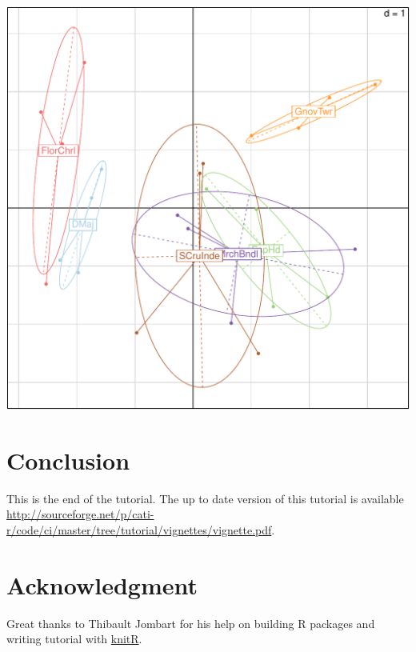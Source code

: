 \documentclass[12pt]{article}\usepackage[]{graphicx}\usepackage[]{color}
\makeatletter
\def\maxwidth{ %
  \ifdim\Gin@nat@width>\linewidth
    \linewidth
  \else
    \Gin@nat@width
  \fi
}
\newenvironment{knitrout}{}{} %
\makeatother
\begin{document}
\begin{knitrout}
\includegraphics[width=\maxwidth]{figure/unnamed-chunk-685} 

\end{knitrout}

\section{Conclusion}
This is the end of the tutorial. The up to date version of this tutorial is available \href{here}{http://sourceforge.net/p/cati-r/code/ci/master/tree/tutorial/vignettes/vignette.pdf}.

\section{Acknowledgment}
Great thanks to Thibault Jombart for his help on building R packages and writing tutorial with \href{http://yihui.name/knitr/}{knitR}.
\end{document}

